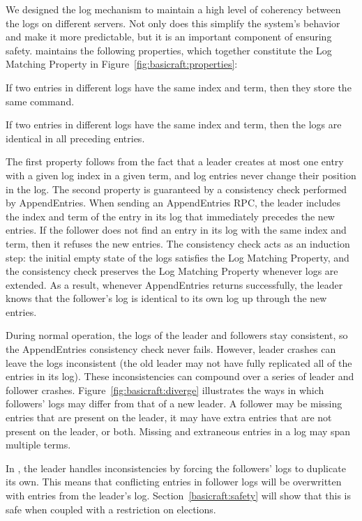 We designed the \name{} log mechanism to maintain a high level
of coherency between the logs on different servers. Not only does this
simplify the system's behavior and make it more predictable,
but it is an important component of ensuring safety.
\name{} maintains
the following properties,
which together constitute the Log Matching Property in
Figure~\ref{fig:basicraft:properties}:
\begin{compactitem}
\item If two entries in different logs have the same index and term,
then they store the same command.
\item If two entries in different logs have the same index and term,
then the logs are identical in all preceding entries.
\end{compactitem}

The first property follows from the fact
that a leader creates at most one entry with a given log index
in a given term, and log entries never change their position in
the log.
The second property is guaranteed by a consistency check
performed by AppendEntries. When sending an AppendEntries RPC,
the leader
includes the index and term of the entry in its log that immediately
precedes the new entries.
If the follower does not find an entry in its log with the same
index and term, then it refuses the new entries.
The consistency check acts as an induction step: the
initial empty state of the logs satisfies the
Log Matching Property,
and the consistency check preserves the
Log Matching Property whenever logs are
extended. As a result, whenever AppendEntries returns successfully,
the leader knows that the follower's log is identical to its own log
up through the new entries.

During normal operation, the logs of the leader and followers stay
consistent, so the AppendEntries consistency check never fails.
However, leader crashes can leave the logs inconsistent (the old
leader may not have fully replicated all of the entries in its log).
These inconsistencies can compound over a series of leader and
follower crashes. Figure~\ref{fig:basicraft:diverge} illustrates
the ways in which followers' logs may differ from that of a
new leader. A follower may be missing entries that are present
on the leader, it may have extra entries that are
not present on the leader, or both.
Missing and extraneous entries in a log may span
multiple terms.

In \name{}, the leader handles
inconsistencies by forcing the followers' logs to duplicate its own.
This means that conflicting entries in follower logs will be overwritten
with entries from the leader's log.
Section~\ref{basicraft:safety} will 
show that this is safe when coupled with a restriction on elections.

